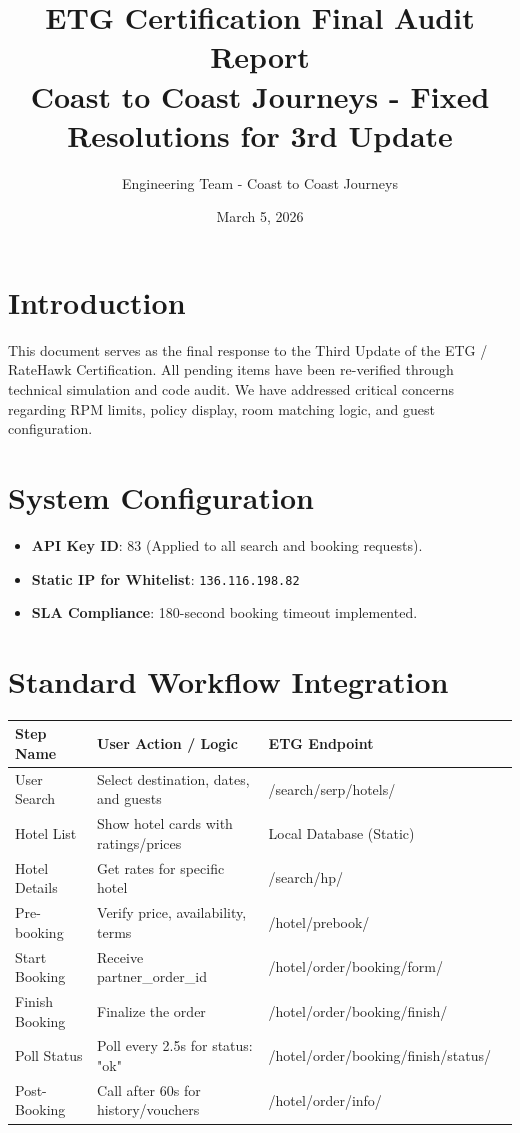 \documentclass[11pt,a4paper]{article}
\title{ETG Certification Final Audit Report \\ \large Coast to Coast Journeys - Fixed Resolutions for 3rd Update}
\author{Engineering Team - Coast to Coast Journeys}
\date{March 5, 2026}
\begin{document}
\maketitle

\section{Introduction}
This document serves as the final response to the Third Update of the ETG / RateHawk Certification. All pending items have been re-verified through technical simulation and code audit. We have addressed critical concerns regarding RPM limits, policy display, room matching logic, and guest configuration.

\section{System Configuration}

\begin{itemize}[leftmargin=1.5cm]
    \item \textbf{API Key ID}: 83 (Applied to all search and booking requests).
    \item \textbf{Static IP for Whitelist}: \texttt{136.116.198.82}
    \item \textbf{SLA Compliance}: 180-second booking timeout implemented.
\end{itemize}

\section{Standard Workflow Integration}

\begin{longtable}{lllp{5cm}}
\toprule
\textbf{Step Name} & \textbf{User Action / Logic} & \textbf{ETG Endpoint} \\
\midrule
User Search & Select destination, dates, and guests & /search/serp/hotels/ \\
Hotel List & Show hotel cards with ratings/prices & Local Database (Static) \\
Hotel Details & Get rates for specific hotel & /search/hp/ \\
Pre-booking & Verify price, availability, terms & /hotel/prebook/ \\
Start Booking & Receive partner\_order\_id & /hotel/order/booking/form/ \\
Finish Booking & Finalize the order & /hotel/order/booking/finish/ \\
Poll Status & Poll every 2.5s for status: "ok" & /hotel/order/booking/finish/status/ \\
Post-Booking & Call after 60s for history/vouchers & /hotel/order/info/ \\
\bottomrule
\end{longtable}
\end{document}
